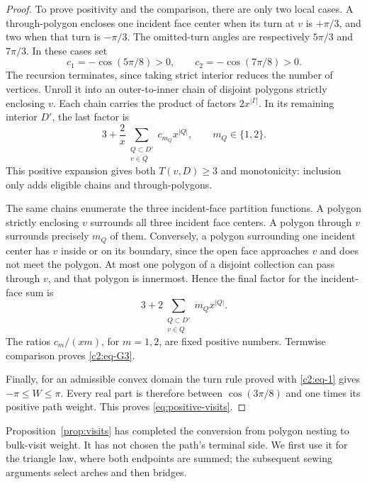 \begin{proof}
To prove positivity and the comparison, there are only two local cases.
A through-polygon encloses one incident face center when its turn at
\(v\) is \(+\pi/3\), and two when that turn is \(-\pi/3\). The omitted-turn
angles are respectively \(5\pi/3\) and \(7\pi/3\). In these cases set
\[
 c_1=-\cos(5\pi/8)>0,\qquad c_2=-\cos(7\pi/8)>0.
\]
The recursion terminates, since taking strict interior reduces the number
of vertices.  Unroll it into an outer-to-inner chain of disjoint polygons
strictly enclosing $v$.  Each chain carries the product of factors
$2x^{|\Gamma|}$.  In its remaining interior $D'$, the last factor is
\[
 3+\frac2x\sum_{\substack{Q\subset D'\\v\in Q}}
             c_{m_Q}x^{|Q|},\qquad m_Q\in\{1,2\}.
\]
This positive expansion gives both $T(v,D)\ge3$ and monotonicity: inclusion
only adds eligible chains and through-polygons.

The same chains enumerate the three incident-face partition functions.
A polygon strictly enclosing $v$ surrounds all three incident face
centers.  A polygon through $v$ surrounds precisely $m_Q$ of them.
Conversely, a polygon surrounding one incident center has $v$ inside
or on its boundary, since the open face approaches $v$ and does not meet
the polygon.  At most one polygon of a disjoint collection can pass
through $v$, and that polygon is innermost.  Hence the final factor for
the incident-face sum is
\[
 3+2\sum_{\substack{Q\subset D'\\v\in Q}}m_Qx^{|Q|}.
\]
The ratios $c_m/(xm)$, for $m=1,2$, are fixed positive numbers.
Termwise comparison proves \eqref{c2:eq-G3}.

Finally, for an admissible convex domain the turn rule proved with
\eqref{c2:eq-1} gives $-\pi\le W\le\pi$.  Every real part is therefore
between $\cos(3\pi/8)$ and one times its positive path weight.
This proves \eqref{eq:positive-visits}.
\end{proof}

Proposition~\ref{prop:visits} has completed the conversion from polygon
nesting to bulk-visit weight.  It has not chosen the path's terminal side.
We first use it for the triangle law, where both endpoints are summed;
the subsequent sewing arguments select arches and then bridges.
